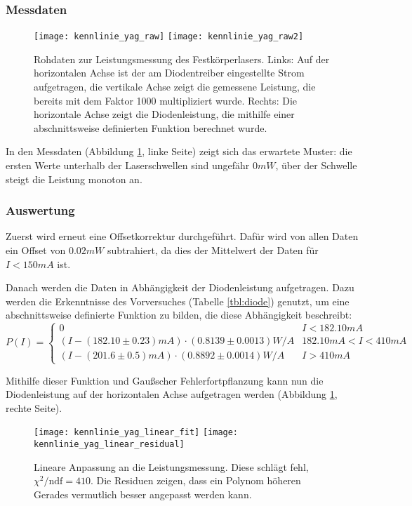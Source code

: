 \documentclass{../Misc/MontavonLaTeX/Montavon}
\newcommand{\halfwidth}{0.48\textwidth}
\begin{document}
\subsubsection{Messdaten}
\begin{figure}[htbp]
\centering
\texttt{[image: kennlinie\_yag\_raw]}
\texttt{[image: kennlinie\_yag\_raw2]}
\caption{Rohdaten zur Leistungsmessung des Festkörperlasers. Links: Auf der horizontalen Achse ist der am Diodentreiber eingestellte Strom aufgetragen, die vertikale Achse zeigt die gemessene Leistung, die bereits mit dem Faktor 1000 multipliziert wurde. Rechts: Die horizontale Achse zeigt die Diodenleistung, die mithilfe einer abschnittsweise definierten Funktion berechnet wurde.}
\label{fig:kennlinie_yag_raw}
\end{figure}

In den Messdaten (Abbildung \ref{fig:kennlinie_yag_raw}, linke Seite) zeigt sich das erwartete Muster: die ersten Werte unterhalb der Laserschwellen sind ungefähr $0 \unit{mW}$, über der Schwelle steigt die Leistung monoton an. 

\subsubsection{Auswertung}
Zuerst wird erneut eine Offsetkorrektur durchgeführt. Dafür wird von allen Daten ein Offset von $0.02 \unit{mW}$ subtrahiert, da dies der Mittelwert der Daten für $I < 150 \unit{mA}$ ist.

Danach werden die Daten in Abhängigkeit der Diodenleistung aufgetragen. Dazu werden die Erkenntnisse des Vorversuches (Tabelle \ref{tbl:diode}) genutzt, um eine abschnittsweise definierte Funktion zu bilden, die diese Abhängigkeit beschreibt:
\[
	P(I) = \left\{ \begin{array}{ll}	0 & I < 182.10 \unit{mA} \\
									(I - (182.10 \pm 0.23) \unit{mA}) \cdot (0.8139 \pm 0.0013) \unit{W/A} & 182.10 \unit{mA} < I < 410 \unit{mA} \\
									(I - (201.6 \pm 0.5) \unit{mA}) \cdot (0.8892 \pm 0.0014) \unit{W/A} & I > 410 \unit{mA}\end{array} \right.
\]

Mithilfe dieser Funktion und Gaußscher Fehlerfortpflanzung kann nun die Diodenleistung auf der horizontalen Achse aufgetragen werden (Abbildung \ref{fig:kennlinie_yag_raw}, rechte Seite).

\begin{figure}
\centering
\texttt{[image: kennlinie\_yag\_linear\_fit]}
\texttt{[image: kennlinie\_yag\_linear\_residual]}
\caption{Lineare Anpassung an die Leistungsmessung. Diese schlägt fehl, $\chi^2 / \textrm{ndf} = 410$. Die Residuen zeigen, dass ein Polynom höheren Gerades vermutlich besser angepasst werden kann.}
\label{fig:kennlinie_yag_linear}
\end{figure}
\end{document}
